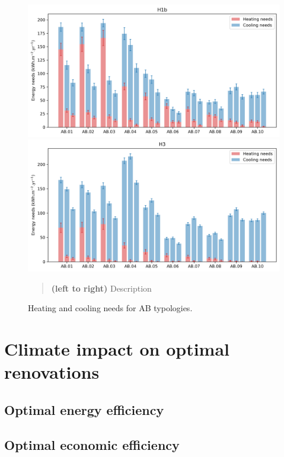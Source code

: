 \documentclass[11pt]{article}
\begin{document}
        \begin{figure}[ht]
            \centering
            \includegraphics[width=0.49\columnwidth]{figures/typology_energy_needs_AB_H1b_2000-2020.png}
            \includegraphics[width=0.49\columnwidth]{figures/typology_energy_needs_AB_H3_2000-2020.png}
            \caption{\label{fig:ab_needs} Heating and cooling needs for AB typologies.}
            \begin{quote}
                \vspace{-2mm}
                \small\noindent
                \textbf{(left to right)} Description
            \end{quote}
        \end{figure}

        

\clearpage
\section{Climate impact on optimal renovations}
\label{sec:opti}

    \subsection{Optimal energy efficiency} %
    \label{sub:optimal_energy_efficiency}
    

    \subsection{Optimal economic efficiency} %
    \label{sub:optimal_economic_efficiency}
    
\end{document}
